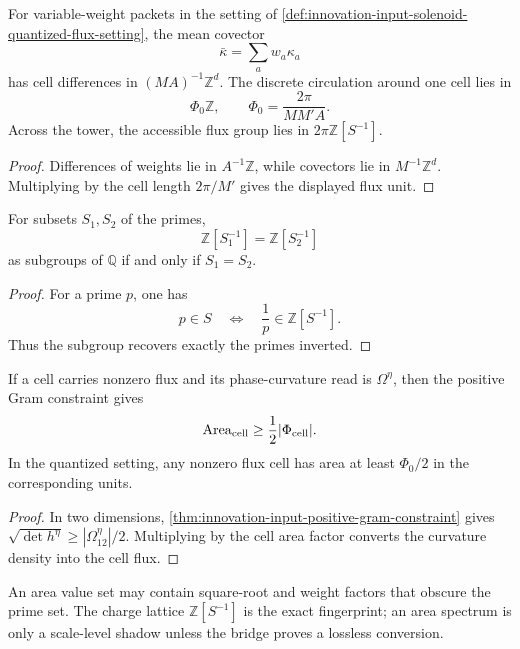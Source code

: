 \begin{theorem}
\label{thm:innovation-input-solenoid-flux-lattice}
For variable-weight packets in the setting of
\autoref{def:innovation-input-solenoid-quantized-flux-setting}, the mean
covector
$$
\bar\kappa=\sum_aw_a\kappa_a
$$
has cell differences in $(MA)^{-1}\mathbb Z^d$. The discrete circulation
around one cell lies in
$$
\Phi_0\mathbb Z,
\qquad
\Phi_0=\frac{2\pi}{MM'A}.
$$
Across the tower, the accessible flux group lies in
$2\pi\mathbb Z[S^{-1}]$.
\end{theorem}

\begin{proof}
Differences of weights lie in $A^{-1}\mathbb Z$, while covectors lie in
$M^{-1}\mathbb Z^d$. Multiplying by the cell length $2\pi/M'$ gives the
displayed flux unit.
\end{proof}

\begin{theorem}
\label{thm:innovation-input-solenoid-charge-lattice-determines-primes}
For subsets $S_1,S_2$ of the primes,
$$
\mathbb Z[S_1^{-1}]=\mathbb Z[S_2^{-1}]
$$
as subgroups of $\mathbb Q$ if and only if $S_1=S_2$.
\end{theorem}

\begin{proof}
For a prime $p$, one has
$$
p\in S
\quad\Longleftrightarrow\quad
\frac1p\in\mathbb Z[S^{-1}].
$$
Thus the subgroup recovers exactly the primes inverted.
\end{proof}

\begin{corollary}
\label{cor:innovation-input-solenoid-flux-area-lower-bound}
If a cell carries nonzero flux and its phase-curvature read is
$\Omega^\eta$, then the positive Gram constraint gives
$$
\operatorname{Area}_{\rm cell}
\ge
\frac12|\Phi_{\rm cell}|.
$$
In the quantized setting, any nonzero flux cell has area at least
$\Phi_0/2$ in the corresponding units.
\end{corollary}

\begin{proof}
In two dimensions,
\autoref{thm:innovation-input-positive-gram-constraint} gives
$\sqrt{\det h^\eta}\ge|\Omega^\eta_{12}|/2$. Multiplying by the cell area
factor converts the curvature density into the cell flux.
\end{proof}

\begin{principle}
\label{prin:innovation-input-solenoid-area-weaker-than-charge}
An area value set may contain square-root and weight factors that obscure
the prime set. The charge lattice $\mathbb Z[S^{-1}]$ is the exact
fingerprint; an area spectrum is only a scale-level shadow unless the
bridge proves a lossless conversion.
\end{principle}

